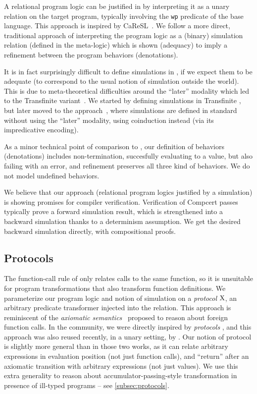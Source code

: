 A relational program logic can be justified in \Iris by interpreting it as a unary relation on the target program, typically involving the \texttt{wp} predicate of the base language. This approach is inspired by CaReSL~\citep*{caresl-2013}. We follow a more direct, traditional approach of interpreting the program logic as a (binary) simulation relation (defined in the \Iris meta-logic) which is shown (adequacy) to imply a refinement between the program behaviors (denotations).

It is in fact surprisingly difficult to define simulations in \Iris, if we expect them to be adequate (to correspond to the usual notion of simulation outside the \Iris world). This is due to meta-theoretical difficulties around the ``later'' modality which led to the Transfinite \Iris variant~\citep*{transfinite-iris-2021}. We started by defining simulations in Transfinite \Iris, but later moved to the \Simuliris approach~\citep*{simuliris-2022}, where simulations are defined in standard \Iris without using the ``later'' modality, using coinduction instead (via its impredicative encoding).

As a minor technical point of comparison to \Simuliris, our definition of behaviors (denotations) includes non-termination, succesfully evaluating to a value, but also failing with an error, and refinement preserves all three kind of behaviors. We do not model undefined behaviors.

We believe that our approach (relational program logics justified by a simulation) is showing promises for compiler verification. Verification of Compcert passes typically prove a forward simulation result, which is strengthened into a backward simulation thanks to a determinism assumption. We get the desired backward simulation directly, with compositional proofs.

\subsection{Protocols}

The function-call rule of \Simuliris only relates calls to the same function, so it is unsuitable for program transformations that also transform function definitions. We parameterize our program logic and notion of simulation on a \emph{protocol} $\mathrm{X}$, an arbitrary predicate transformer injected into the relation. This approach is reminiscent of the \emph{axiomatic semantics}~\citep*{axiomatic-semantics-2014} proposed to reason about foreign function calls. In the \Iris community, we were directly inspired by \emph{protocols} \citet*{protocols-2021}, and this approach was also reused recently, in a unary setting, by \citet*{melocoton-2023}. Our notion of protocol is slightly more general than in those two works, as it can relate arbitrary expressions in evaluation position (not just function calls), and ``return'' after an axiomatic transition with arbitrary expressions (not just values). We use this extra generality to reason about accumulator-passing-style transformation in presence of ill-typed programs -- see \cref{subsec:protocols}.

